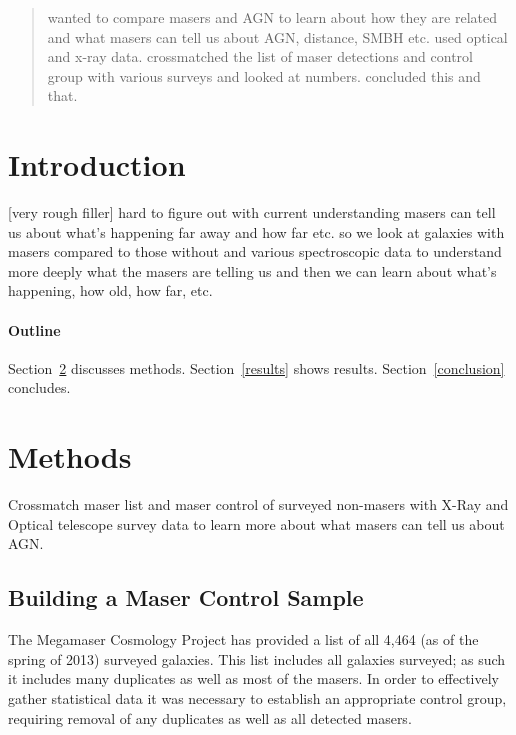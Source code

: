 \documentclass[12pt]{article}
\begin{document}
\maketitle

\begin{abstract}
 wanted to compare masers and AGN to learn about how they are related and what masers can tell us about AGN, distance, SMBH etc. used optical and x-ray data. crossmatched the list of maser detections and control group with various surveys and looked at numbers. concluded this and that.
\end{abstract}

\section{Introduction}
[very rough filler] hard to figure out with current understanding masers can tell us about what's happening far away and how far etc. so we look at galaxies with masers compared to those without and various spectroscopic data to understand more deeply what the masers are telling us and then we can learn about what's happening, how old, how far, etc.

\paragraph{Outline}

Section~\ref{methods} discusses methods. Section~\ref{results} shows results. Section~\ref{conclusion} concludes.

\section{Methods}\label{methods}
Crossmatch maser list and maser control of surveyed non-masers with X-Ray and Optical telescope survey data to learn more about what masers can tell us about AGN.

\subsection{Building a Maser Control Sample}\label{control}
The Megamaser Cosmology Project has provided a list of all 4,464 (as of the spring of 2013) surveyed galaxies\cite{surv}. This list includes all galaxies surveyed; as such it includes many duplicates as well as most of the masers. In order to effectively gather statistical data it was necessary to establish an appropriate control group, requiring removal of any duplicates as well as all detected masers.\\
\end{document}
